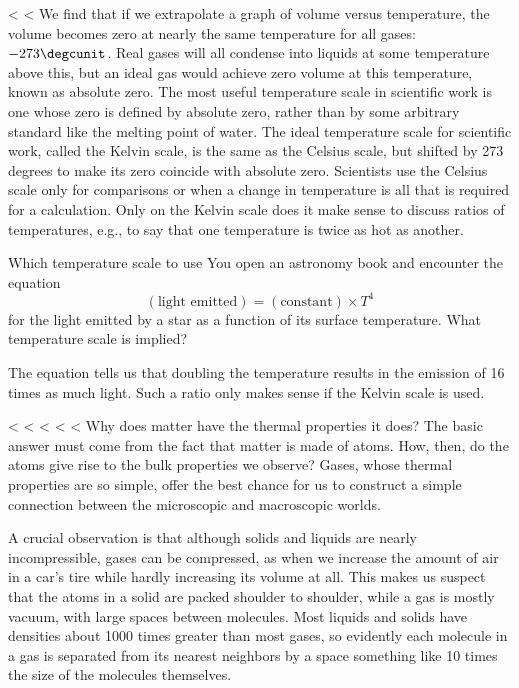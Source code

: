 <%
<%
We find that if we extrapolate a graph of volume versus
temperature, the volume becomes zero at nearly the same
temperature for all gases: $-273\degcunit$. Real gases will all
condense into liquids at some temperature above this, but an
ideal gas would achieve zero volume at this temperature,
known as absolute zero. The most useful temperature scale in
scientific work is one whose zero is defined by absolute
zero, rather than by some arbitrary standard like the
melting point of water. The ideal temperature scale
for scientific work, called the Kelvin scale, is
the same as the Celsius scale, but shifted by 273 degrees to
make its zero coincide with absolute zero. Scientists use
the Celsius scale only for comparisons or when a change in
temperature is all that is required for a calculation. Only
on the Kelvin scale does it make sense to discuss ratios of
temperatures, e.g., to say that one temperature is twice as
hot as another.

\begin{eg}{Which temperature scale to use}
\egquestion
You open an astronomy book and encounter the
equation
\begin{equation*}
        (\text{light emitted}) = (\text{constant}) \times  T^ 4
\end{equation*}
for the light emitted by a star as a function of its surface
temperature. What temperature scale is implied?

\eganswer
The equation tells us that doubling the
temperature results in the emission of 16 times as much
light. Such a ratio only makes sense if the Kelvin scale is
used.
\end{eg}


\vfill
<%
<%
<%
<%
<%
Why does matter have the thermal properties it does? The
basic answer must come from the fact that matter is made of
atoms.
How, then, do the atoms give rise to the bulk properties we
observe? Gases, whose thermal properties are so simple,
offer the best chance for us to construct a simple
connection between the microscopic and macroscopic worlds.

A crucial observation is that although solids and liquids
are nearly incompressible, gases can be compressed, as when
we increase the amount of air in a car's tire while hardly
increasing its volume at all. This makes us suspect that the
atoms in a solid are packed shoulder to shoulder, while a
gas is mostly vacuum, with large spaces between molecules.
Most liquids and solids have densities about 1000 times
greater than most gases, so evidently each molecule in a gas
is separated from its nearest neighbors by a space something
like 10 times the size of the molecules themselves.

